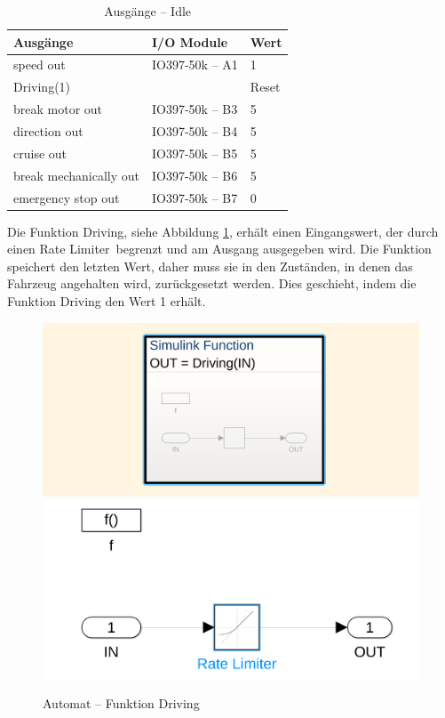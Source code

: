 \pagebreak[1]
\begin{table}[!ht]
	\centering
	\caption{Ausgänge – Idle}
	\label{Automat_man:tab:z_idle}
	\begin{tabular}{lll}
		\hline
		\textbf{Ausgänge}                           & \textbf{I/O Module}                 & \textbf{Wert} \\ \hline
		\multicolumn{1}{l|}{speed out}              & \multicolumn{1}{l|}{IO397-50k – A1} & 1             \\
		\multicolumn{1}{l|}{Driving(1)}             & \multicolumn{1}{l|}{}               & Reset         \\
		\multicolumn{1}{l|}{break motor out}        & \multicolumn{1}{l|}{IO397-50k – B3} & 5             \\
		\multicolumn{1}{l|}{direction out}          & \multicolumn{1}{l|}{IO397-50k – B4} & 5             \\
		\multicolumn{1}{l|}{cruise out}             & \multicolumn{1}{l|}{IO397-50k – B5} & 5             \\
		\multicolumn{1}{l|}{break mechanically out} & \multicolumn{1}{l|}{IO397-50k – B6} & 5             \\
		\multicolumn{1}{l|}{emergency stop out}     & \multicolumn{1}{l|}{IO397-50k – B7} & 0             \\ \hline
	\end{tabular}
\end{table}
\pagebreak[1]

Die Funktion Driving, siehe Abbildung \ref{Automat:img:fnc_Driving}, erhält einen Eingangswert, der durch einen \frqq Rate Limiter\flqq\ begrenzt und am Ausgang ausgegeben wird. Die Funktion speichert den letzten Wert, daher muss sie in den Zuständen, in denen das Fahrzeug angehalten wird, zurückgesetzt werden. Dies geschieht, indem die Funktion Driving den Wert 1 erhält.\\

\pagebreak[1]
\begin{figure}[!ht]
	\begin{center}
		\includegraphics[width=.5\textwidth]{img/5_simulation/Automat_funktion_1.png}
		\includegraphics[width=.75\textwidth]{img/5_simulation/Automat_funktion_2.png}
		\caption{Automat – Funktion Driving}
		\label{Automat:img:fnc_Driving}
	\end{center}
\end{figure}
\pagebreak[4]

